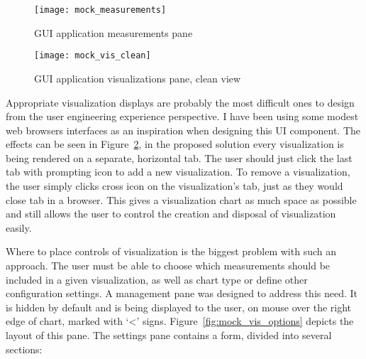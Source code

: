 \begin{figure}[ht]
\centering
\texttt{[image: mock\_measurements]}
\caption{GUI application measurements pane}
\label{fig:mock_measurements}
\end{figure}

\begin{figure}[ht]
\centering
\texttt{[image: mock\_vis\_clean]}
\caption{GUI application visualizations pane, clean view}
\label{fig:mock_vis_clean}
\end{figure}

Appropriate visualization displays are probably the most difficult ones to design from the user engineering experience perspective. I have been using some modest web browsers interfaces as an inspiration when designing this UI component. The effects can be seen in Figure~\ref{fig:mock_vis_clean}, in the proposed solution every visualization is being rendered on a separate, horizontal tab. The user should just click the last tab with prompting icon to add a new visualization. To remove a visualization, the user simply clicks cross icon on the visualization\rq{}s tab, just as they would close tab in a browser. This gives a visualization chart as much space as possible and still allows the user to control the creation and disposal of visualization easily.

Where to place controls of visualization is the biggest problem with such an approach. The user must be able to choose which measurements should be included in a given visualization, as well as chart type or define other configuration settings. A management pane was designed to address this need. It is hidden by default and is being displayed to the user, on mouse over the right edge of chart, marked with \lq{}<\rq{} signs. Figure~\ref{fig:mock_vis_options} depicts the layout of this pane. The settings pane contains a form, divided into several sections:

